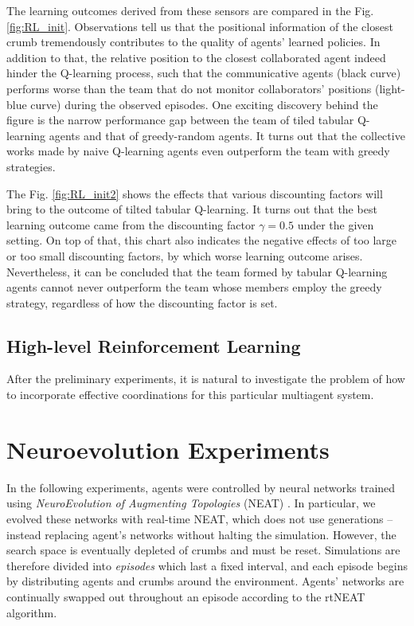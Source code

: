 \documentclass[conference]{IEEEtran}
\begin{document}
The learning outcomes derived from these sensors are compared in the
Fig. \ref{fig:RL_init}. 
Observations tell us that the positional information of the closest crumb
tremendously contributes to the quality of agents' learned policies. 
In addition to that, the relative position to the closest collaborated agent
indeed hinder the Q-learning process, such that the communicative agents (black
curve) performs worse than the team that do not monitor collaborators'
positions (light-blue curve) during the observed episodes. One exciting
discovery behind the figure is the narrow performance gap between the team of
tiled tabular Q-learning agents and that of greedy-random agents. It turns out
that the collective works made by naive Q-learning agents even outperform the
team with greedy strategies.

The Fig. \ref{fig:RL_init2} shows the effects that various discounting factors
will bring to the outcome of tilted tabular Q-learning. It turns out that the
best learning outcome came from the discounting factor $\gamma = 0.5$ under
the given setting. On top of that, this chart also indicates the negative
effects of too large or too small discounting factors, by which worse learning
outcome arises. Nevertheless, it can be concluded that the team formed by
tabular Q-learning agents cannot never outperform the team whose members
employ the greedy strategy, regardless of how the discounting factor is set.

\subsection{High-level Reinforcement Learning}
After the preliminary experiments, it is natural to investigate the problem of how
to incorporate effective coordinations for this particular multiagent system.



\section{Neuroevolution Experiments}
\label{section:neuro}

In the following experiments, agents were controlled by neural networks
trained using \textit{NeuroEvolution of Augmenting Topologies} (NEAT)
\cite{stanley2002evolving}.
In particular, we evolved these networks with real-time NEAT, which does not use generations -- instead replacing agent's networks without halting the simulation. However, the search space is eventually depleted of crumbs and must be reset. Simulations are therefore divided into \textit{episodes} which last a fixed interval, and  each episode begins by distributing agents and crumbs around the environment. Agents' networks are continually swapped out throughout an episode according to the rtNEAT algorithm.
\end{document}
